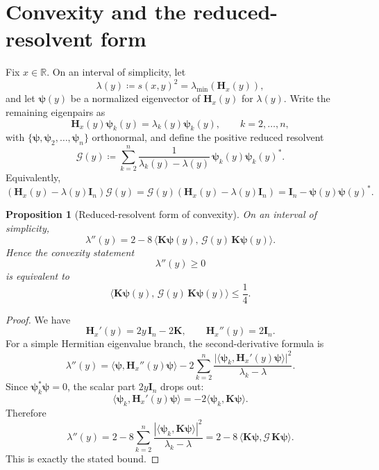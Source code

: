 \documentclass[11pt]{article}
\newtheorem{proposition}[theorem]{Proposition}
\begin{document}
\section{Convexity and the reduced-resolvent form}

Fix \(x\in\mathbb R\). On an interval of simplicity, let
\[
\lambda(y)\coloneqq s(x,y)^2=\lambda_{\min}(\mathbf H_x(y)),
\]
and let \(\boldsymbol{\psi}(y)\) be a normalized eigenvector of \(\mathbf H_x(y)\) for \(\lambda(y)\). Write the remaining eigenpairs as
\[
\mathbf H_x(y)\boldsymbol{\psi}_k(y)=\lambda_k(y)\boldsymbol{\psi}_k(y),
\qquad
k=2,\dots,n,
\]
with \(\{\boldsymbol{\psi},\boldsymbol{\psi}_2,\dots,\boldsymbol{\psi}_n\}\) orthonormal, and define the positive reduced resolvent
\[
\mathcal G(y)\coloneqq \sum_{k=2}^n \frac{1}{\lambda_k(y)-\lambda(y)}\,\boldsymbol{\psi}_k(y)\boldsymbol{\psi}_k(y)^*.
\]
Equivalently,
\[
(\mathbf H_x(y)-\lambda(y)\mathbf I_n)\mathcal G(y)=\mathcal G(y)(\mathbf H_x(y)-\lambda(y)\mathbf I_n)=\mathbf I_n-\boldsymbol{\psi}(y)\boldsymbol{\psi}(y)^*.
\]

\begin{proposition}[Reduced-resolvent form of convexity]\label{prop:reduced-resolvent}
On an interval of simplicity,
\[
\lambda''(y)
=
2-8\,\bigl\langle \mathbf K\boldsymbol{\psi}(y),\,\mathcal G(y)\,\mathbf K\boldsymbol{\psi}(y)\bigr\rangle.
\]
Hence the convexity statement
\[
\lambda''(y)\ge 0
\]
is equivalent to
\[
\boxed{
\bigl\langle \mathbf K\boldsymbol{\psi}(y),\,\mathcal G(y)\,\mathbf K\boldsymbol{\psi}(y)\bigr\rangle\le \frac14.
}
\]
\end{proposition}

\begin{proof}
We have
\[
\mathbf H_x'(y)=2y\,\mathbf I_n-2\mathbf K,
\qquad
\mathbf H_x''(y)=2\mathbf I_n.
\]
For a simple Hermitian eigenvalue branch, the second-derivative formula is
\[
\lambda''(y)
=
\langle \boldsymbol{\psi},\mathbf H_x''(y)\boldsymbol{\psi}\rangle
-
2\sum_{k=2}^n \frac{\bigl|\langle \boldsymbol{\psi}_k,\mathbf H_x'(y)\boldsymbol{\psi}\rangle\bigr|^2}{\lambda_k-\lambda}.
\]
Since \(\boldsymbol{\psi}_k^*\boldsymbol{\psi}=0\), the scalar part \(2y\mathbf I_n\) drops out:
\[
\langle \boldsymbol{\psi}_k,\mathbf H_x'(y)\boldsymbol{\psi}\rangle
=
-2\langle \boldsymbol{\psi}_k,\mathbf K\boldsymbol{\psi}\rangle.
\]
Therefore
\[
\lambda''(y)
=
2-8\sum_{k=2}^n \frac{|\langle \boldsymbol{\psi}_k,\mathbf K\boldsymbol{\psi}\rangle|^2}{\lambda_k-\lambda}
=
2-8\,\langle \mathbf K\boldsymbol{\psi},\mathcal G\,\mathbf K\boldsymbol{\psi}\rangle.
\]
This is exactly the stated bound.
\end{proof}
\end{document}
